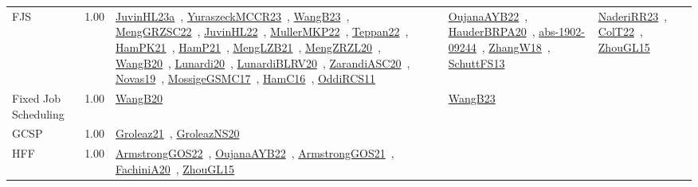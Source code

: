 {\begin{longtable}{p{3cm}r>{\raggedright\arraybackslash}p{6cm}>{\raggedright\arraybackslash}p{6cm}>{\raggedright\arraybackslash}p{8cm}}
\index{FJS}\index{Classification!FJS}FJS &  1.00 & \href{../works/JuvinHL23a.pdf}{JuvinHL23a}~\cite{JuvinHL23a}, \href{../works/YuraszeckMCCR23.pdf}{YuraszeckMCCR23}~\cite{YuraszeckMCCR23}, \href{../works/WangB23.pdf}{WangB23}~\cite{WangB23}, \href{../works/MengGRZSC22.pdf}{MengGRZSC22}~\cite{MengGRZSC22}, \href{../works/JuvinHL22.pdf}{JuvinHL22}~\cite{JuvinHL22}, \href{../works/MullerMKP22.pdf}{MullerMKP22}~\cite{MullerMKP22}, \href{../works/Teppan22.pdf}{Teppan22}~\cite{Teppan22}, \href{../works/HamPK21.pdf}{HamPK21}~\cite{HamPK21}, \href{../works/HamP21.pdf}{HamP21}~\cite{HamP21}, \href{../works/MengLZB21.pdf}{MengLZB21}~\cite{MengLZB21}, \href{../works/MengZRZL20.pdf}{MengZRZL20}~\cite{MengZRZL20}, \href{../works/WangB20.pdf}{WangB20}~\cite{WangB20}, \href{../works/Lunardi20.pdf}{Lunardi20}~\cite{Lunardi20}, \href{../works/LunardiBLRV20.pdf}{LunardiBLRV20}~\cite{LunardiBLRV20}, \href{../works/ZarandiASC20.pdf}{ZarandiASC20}~\cite{ZarandiASC20}, \href{../works/Novas19.pdf}{Novas19}~\cite{Novas19}, \href{../works/MossigeGSMC17.pdf}{MossigeGSMC17}~\cite{MossigeGSMC17}, \href{../works/HamC16.pdf}{HamC16}~\cite{HamC16}, \href{../works/OddiRCS11.pdf}{OddiRCS11}~\cite{OddiRCS11} & \href{../works/OujanaAYB22.pdf}{OujanaAYB22}~\cite{OujanaAYB22}, \href{../works/HauderBRPA20.pdf}{HauderBRPA20}~\cite{HauderBRPA20}, \href{../works/abs-1902-09244.pdf}{abs-1902-09244}~\cite{abs-1902-09244}, \href{../works/ZhangW18.pdf}{ZhangW18}~\cite{ZhangW18}, \href{../works/SchuttFS13.pdf}{SchuttFS13}~\cite{SchuttFS13} & \href{../works/NaderiRR23.pdf}{NaderiRR23}~\cite{NaderiRR23}, \href{../works/ColT22.pdf}{ColT22}~\cite{ColT22}, \href{../works/ZhouGL15.pdf}{ZhouGL15}~\cite{ZhouGL15}\\
\index{Fixed Job Scheduling}\index{Classification!Fixed Job Scheduling}Fixed Job Scheduling &  1.00 & \href{../works/WangB20.pdf}{WangB20}~\cite{WangB20} & \href{../works/WangB23.pdf}{WangB23}~\cite{WangB23} & \\
\index{GCSP}\index{Classification!GCSP}GCSP &  1.00 & \href{../works/Groleaz21.pdf}{Groleaz21}~\cite{Groleaz21}, \href{../works/GroleazNS20.pdf}{GroleazNS20}~\cite{GroleazNS20} &  & \\
\index{HFF}\index{Classification!HFF}HFF &  1.00 & \href{../works/ArmstrongGOS22.pdf}{ArmstrongGOS22}~\cite{ArmstrongGOS22}, \href{../works/OujanaAYB22.pdf}{OujanaAYB22}~\cite{OujanaAYB22}, \href{../works/ArmstrongGOS21.pdf}{ArmstrongGOS21}~\cite{ArmstrongGOS21}, \href{../works/FachiniA20.pdf}{FachiniA20}~\cite{FachiniA20}, \href{../works/ZhouGL15.pdf}{ZhouGL15}~\cite{ZhouGL15} &  & \\

\end{longtable}}
